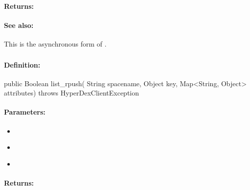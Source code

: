 \paragraph{Returns:}


\paragraph{See also:}  This is the asynchronous form of .

\pagebreak
\subsubsection{}
\label{api:java:list_rpush}


\paragraph{Definition:}
\begin{javacode}
public Boolean list_rpush(
        String spacename,
        Object key,
        Map<String, Object> attributes) throws HyperDexClientException
\end{javacode}

\paragraph{Parameters:}
\begin{itemize}[noitemsep]
\item {}\\

\item {}\\

\item {}\\

\end{itemize}

\paragraph{Returns:}


